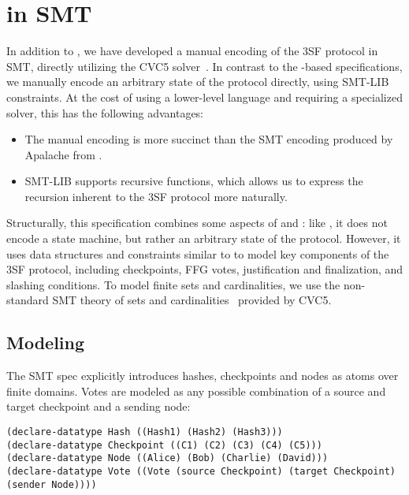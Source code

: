 
\section{\SpecThreeB{} in SMT}\label{sec:smt}

In addition to \SpecThree{}, we have developed a manual encoding of the 3SF
protocol in SMT, directly utilizing the CVC5 solver~\cite{BarbosaBBKLMMMN22}.
In contrast to the \tlap{}-based specifications, we manually encode an
arbitrary state of the protocol
directly, using SMT-LIB constraints. At the cost of using a lower-level language and
requiring a specialized solver, this has the following advantages:
\begin{itemize}
  \item The manual encoding is more succinct than the SMT encoding produced by
    Apalache from \tlap{}.
  \item SMT-LIB supports recursive functions, which allows us to express the
    recursion inherent to the 3SF protocol more naturally.
\end{itemize}

Structurally, this specification combines some aspects of \SpecTwo{} and
\SpecThree{}: like \SpecTwo{}, it does not encode a state machine, but rather
an arbitrary state of the protocol. However, it uses data structures and
constraints similar to \SpecThree{} to model key components of the 3SF
protocol, including checkpoints, FFG votes, justification and finalization,
and slashing conditions.
To model finite sets and cardinalities, we use the non-standard SMT theory of
sets and cardinalities~\cite{DBLP:journals/lmcs/BansalBRT18} provided by CVC5.

\subsection{Modeling}
The SMT spec explicitly introduces hashes, checkpoints and nodes as atoms over
finite domains. Votes are modeled as any possible combination
of a source and target checkpoint and a sending node:

\begin{lstlisting}[language=smt]
(declare-datatype Hash ((Hash1) (Hash2) (Hash3)))
(declare-datatype Checkpoint ((C1) (C2) (C3) (C4) (C5)))
(declare-datatype Node ((Alice) (Bob) (Charlie) (David)))
(declare-datatype Vote ((Vote (source Checkpoint) (target Checkpoint) (sender Node))))
\end{lstlisting}

